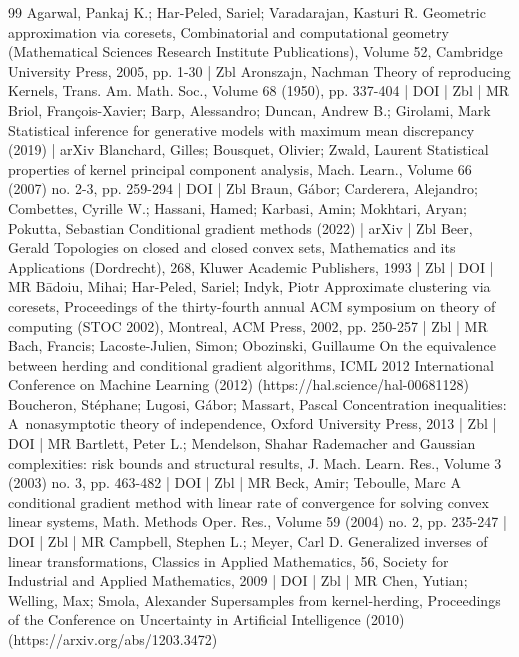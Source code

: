 \begin{thebibliography}{99}
Agarwal, Pankaj K.; Har-Peled, Sariel; Varadarajan, Kasturi R. Geometric approximation via coresets, Combinatorial and computational geometry (Mathematical Sciences Research Institute Publications), Volume 52, Cambridge University Press, 2005, pp. 1-30 | Zbl
Aronszajn, Nachman Theory of reproducing Kernels, Trans. Am. Math. Soc., Volume 68 (1950), pp. 337-404 | DOI | Zbl | MR
Briol, François-Xavier; Barp, Alessandro; Duncan, Andrew B.; Girolami, Mark Statistical inference for generative models with maximum mean discrepancy (2019) | arXiv
Blanchard, Gilles; Bousquet, Olivier; Zwald, Laurent Statistical properties of kernel principal component analysis, Mach. Learn., Volume 66 (2007) no. 2-3, pp. 259-294 | DOI | Zbl
Braun, Gábor; Carderera, Alejandro; Combettes, Cyrille W.; Hassani, Hamed; Karbasi, Amin; Mokhtari, Aryan; Pokutta, Sebastian Conditional gradient methods (2022) | arXiv | Zbl
Beer, Gerald Topologies on closed and closed convex sets, Mathematics and its Applications (Dordrecht), 268, Kluwer Academic Publishers, 1993 | Zbl | DOI | MR
Bādoiu, Mihai; Har-Peled, Sariel; Indyk, Piotr Approximate clustering via coresets, Proceedings of the thirty-fourth annual ACM symposium on theory of computing (STOC 2002), Montreal, ACM Press, 2002, pp. 250-257 | Zbl | MR
Bach, Francis; Lacoste-Julien, Simon; Obozinski, Guillaume On the equivalence between herding and conditional gradient algorithms, ICML 2012 International Conference on Machine Learning (2012) (https://hal.science/hal-00681128)
Boucheron, Stéphane; Lugosi, Gábor; Massart, Pascal Concentration inequalities: A nonasymptotic theory of independence, Oxford University Press, 2013 | Zbl | DOI | MR
Bartlett, Peter L.; Mendelson, Shahar Rademacher and Gaussian complexities: risk bounds and structural results, J. Mach. Learn. Res., Volume 3 (2003) no. 3, pp. 463-482 | DOI | Zbl | MR
Beck, Amir; Teboulle, Marc A conditional gradient method with linear rate of convergence for solving convex linear systems, Math. Methods Oper. Res., Volume 59 (2004) no. 2, pp. 235-247 | DOI | Zbl | MR
Campbell, Stephen L.; Meyer, Carl D. Generalized inverses of linear transformations, Classics in Applied Mathematics, 56, Society for Industrial and Applied Mathematics, 2009 | DOI | Zbl | MR
Chen, Yutian; Welling, Max; Smola, Alexander Supersamples from kernel-herding, Proceedings of the Conference on Uncertainty in Artificial Intelligence (2010) (https://arxiv.org/abs/1203.3472)

\end{thebibliography}
